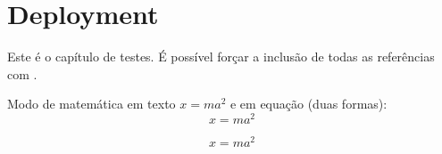 \chapter{Deployment} \label{cap:deployment}

Este é o capítulo de testes. 
É possível forçar a inclusão de todas as referências com \cite{*}.

Modo de matemática em texto $x = ma^2$ e em equação (duas formas):
\[
    x = ma^2
\]

\begin{equation}
    x = ma^2
\end{equation}